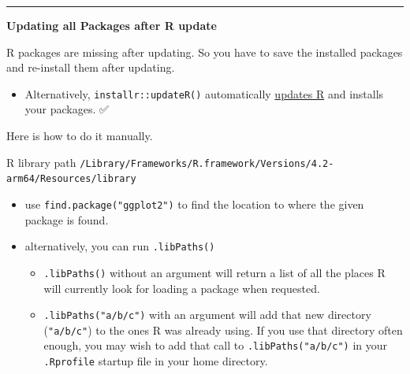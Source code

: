 \documentclass[
]{book}
\newenvironment{Shaded}{\begin{snugshade}}{\end{snugshade}}
\newcommand{\AttributeTok}[1]{\textcolor[rgb]{0.13,0.29,0.53}{#1}}
\newcommand{\CommentTok}[1]{\textcolor[rgb]{0.56,0.35,0.01}{\textit{#1}}}
\newcommand{\ConstantTok}[1]{\textcolor[rgb]{0.56,0.35,0.01}{#1}}
\newcommand{\DecValTok}[1]{\textcolor[rgb]{0.00,0.00,0.81}{#1}}
\newcommand{\DocumentationTok}[1]{\textcolor[rgb]{0.56,0.35,0.01}{\textbf{\textit{#1}}}}
\newcommand{\FunctionTok}[1]{\textcolor[rgb]{0.13,0.29,0.53}{\textbf{#1}}}
\newcommand{\NormalTok}[1]{#1}
\newcommand{\OtherTok}[1]{\textcolor[rgb]{0.56,0.35,0.01}{#1}}
\newcommand{\SpecialCharTok}[1]{\textcolor[rgb]{0.81,0.36,0.00}{\textbf{#1}}}
\newcommand{\StringTok}[1]{\textcolor[rgb]{0.31,0.60,0.02}{#1}}
\providecommand{\tightlist}{%
  \setlength{\itemsep}{0pt}\setlength{\parskip}{0pt}}
\begin{document}
\begin{center}\rule{0.5\linewidth}{0.5pt}\end{center}

\textbf{Updating all Packages after {R update}}

R packages are missing after updating. So you have to save the installed packages and re-install them after updating.

\begin{itemize}
\tightlist
\item
  Alternatively, \texttt{installr::updateR()} automatically \hyperref[update-r]{updates R} and installs your packages. ✅
\end{itemize}

Here is how to do it manually.

\begin{Shaded}
\end{Shaded}

R library path \texttt{/Library/Frameworks/R.framework/Versions/4.2-arm64/Resources/library}

\begin{itemize}
\tightlist
\item
  use \texttt{find.package("ggplot2")} to find the location to where the given package is found.
\item
  alternatively, you can run \texttt{.libPaths()}

  \begin{itemize}
  \tightlist
  \item
    \texttt{.libPaths()} without an argument will return a list of all the places R will currently look for loading a package when requested.
  \item
    \texttt{.libPaths("a/b/c")} with an argument will add that new directory (\texttt{"a/b/c"}) to the ones R was already using. If you use that directory often enough, you may wish to add that call to \texttt{.libPaths("a/b/c")} in your \texttt{.Rprofile} startup file in your home directory.
  \end{itemize}
\end{itemize}
\end{document}

